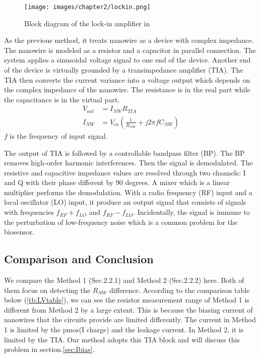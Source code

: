 \begin{figure}[!htbp]
        \centering
        \texttt{[image: images/chapter2/lockin.png]}
        \caption{Block diagram of the lock-in amplifier in \cite{Jlockin}}
        \label{fig:lockin}
\end{figure}

As the previous method, it treats nanowire as a device with complex impedance.
The nanowire is modeled as a resistor and a capacitor in parallel connection.
The system applies a sinusoidal voltage signal to one end of the device.
Another end of the device is virtually grounded by a transimpedance amplifier (TIA).
The TIA then converts the current variance into a voltage output which depends on the complex impedance of the nanowire.
The resistance is in the real part while the capacitance is in the virtual part.
\setlength{\mathindent}{5.5cm}
\begin{align}
    V_{out} &= I_{NW}R_{TIA} \\
    I_{NW} &= V_{in}(\frac{1}{R_{NW}} + j 2\pi fC_{NW})
\end{align}
$f$ is the frequency of input signal.

The output of TIA is followed by a controllable bandpass filter (BP).
The BP removes high-order harmonic interferences.
Then the signal is demodulated.
The resistive and capacitive impedance values are resolved through two channels: I and Q with their phase different by 90 degrees.
A mixer which is a linear multiplier performs the demodulation.
With a radio frequency (RF) input and a local oscillator (LO) input, it produce an output signal that consists of signals with frequencies $f_{RF} + f_{LO}$ and $f_{RF} - f_{LO}$.
Incidentally, the signal is immune to the perturbation of low-frequency noise which is a common problem for the biosensor.

\subsection{Comparison and Conclusion} \label{sec:ch2CC}
We compare the Method 1 (Sec.2.2.1) and Method 2 (Sec.2.2.2) here.
Both of them focus on detecting the $R_{NW}$ difference.
According to the comparison table below (\ref{tb:LVtable}), we can see the resistor measurement range of Method 1 is different from Method 2 by a large extent.
This is because the biasing current of nanowires that the circuits provide are limited differently.
The current in Method 1 is limited by the pmos(I charge) and the leakage current.
In Method 2, it is limited by the TIA.
Our method adopts this TIA block and will discuss this problem in section.\ref{sec:Ibias}.

